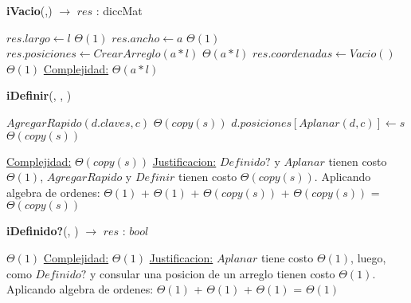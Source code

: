 \begin{Algoritmos}

\medskip
	
  	\medskip
  
\begin{algorithm}[H]{\textbf{iVacio}(,) $\to$ $res$ : diccMat}
    	\begin{algorithmic}[1]
			\State $res.largo \gets l$ \Comment $\Theta(1)$
			\State $res.ancho \gets a$ \Comment $\Theta(1)$
			\State $res.posiciones \gets CrearArreglo(a * l)$ \Comment $\Theta(a*l)$
			\State $res.coordenadas \gets Vacio()$ \Comment $\Theta(1)$
			\medskip
			\Statex \underline{Complejidad:} $\Theta(a*l)$
        \end{algorithmic}
\end{algorithm}

\begin{algorithm}[H]{\textbf{iDefinir}(, , )}
    	\begin{algorithmic}[1]
                \State $AgregarRapido(d.claves, c)$ \Comment $\Theta(copy(s))$
            \EndIf
            \State $d.posiciones[Aplanar(d, c)] \gets s$ \Comment $\Theta(copy(s))$
			
			\medskip
			\Statex \underline{Complejidad:} $\Theta(copy(s))$
            \Statex \underline{Justificacion:} $Definido?$ y $Aplanar$ tienen costo $\Theta(1)$, $AgregarRapido$ y $Definir$ tienen costo $\Theta(copy(s))$. Aplicando algebra de ordenes: $\Theta(1)$ + $\Theta(1)$ + $\Theta(copy(s))$  + $\Theta(copy(s))$ = $\Theta(copy(s))$
        \end{algorithmic}
\end{algorithm}

\begin{algorithm}[H]{\textbf{iDefinido?}(, ) $\to$ $res$ : $bool$}
    	\begin{algorithmic}[1]
          $\Theta(1)$
			\medskip
			\Statex \underline{Complejidad:} $\Theta(1)$
            \Statex \underline{Justificacion:} $Aplanar$ tiene costo $\Theta(1)$, luego, como $Definido?$ y consular una posicion de un arreglo tienen costo $\Theta(1)$. Aplicando algebra de ordenes: $\Theta(1)$ + $\Theta(1)$ + $\Theta(1)$ = $\Theta(1)$
        \end{algorithmic}
\end{algorithm}


\end{Algoritmos}
